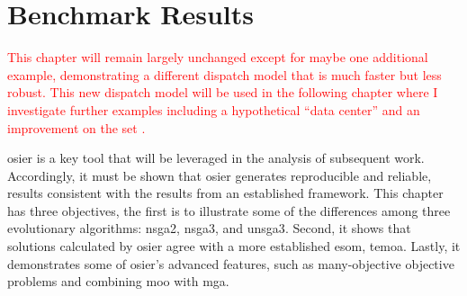 \chapter{Benchmark Results}
\label{chapter:benchmark-results}

\textcolor{red}{This chapter will remain largely unchanged except for maybe one
additional example, demonstrating a different dispatch model that is much faster
but less robust. This new dispatch model will be used in the following chapter
where I investigate further examples including a hypothetical ``data center''
and an improvement on the \acf{set} \cite{wigeland_nuclear_2014}.}

\ac{osier} is a key tool that will be leveraged in the analysis of subsequent
work. Accordingly, it must be shown that \ac{osier} generates reproducible and
reliable, results consistent with the results from an established framework.
This chapter has three objectives, the first is to illustrate some of the
differences among three evolutionary algorithms: \ac{nsga2}, \ac{nsga3}, and
\ac{unsga3}. Second, it shows that solutions calculated by \ac{osier} agree with
a more established \ac{esom}, \ac{temoa}. Lastly, it demonstrates some of
\ac{osier}'s advanced features, such as many-objective objective problems and
combining \ac{moo} with \ac{mga}.






